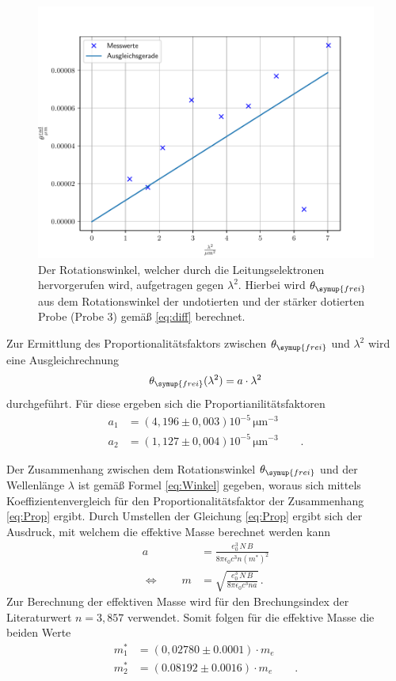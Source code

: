 \begin{figure}[h]
    \centering
    \includegraphics[width=1\textwidth]{Winkel_frei2.pdf}
    \caption{Der Rotationswinkel, welcher durch die Leitungselektronen hervorgerufen wird, aufgetragen gegen $\lambda^2$. Hierbei wird $\theta_{\symup{frei}}$ aus dem Rotationswinkel der undotierten und der stärker dotierten Probe (Probe 3) gemäß \ref{eq:diff} berechnet.}
    \label{fig:afig6}
\end{figure}
\FloatBarrier
\noindent

Zur Ermittlung des Proportionalitätsfaktors zwischen $\theta_{\symup{frei}}$ und
$\lambda^2$ wird eine Ausgleichrechnung
\begin{equation*}
    \theta_{\symup{frei}}(\lambda^2) = a\cdot \lambda ^2
\end{equation*}
durchgeführt.
Für diese ergeben sich die Proportianilitätsfaktoren
\begin{align*}
    a_1 &= (4,196 \pm 0,003)10^{-5}\, \si{\micro\meter}^{-3}\\
    a_2 &= (1,127 \pm 0,004)10^{-5}\, \si{\micro\meter}^{-3} \qquad .
\end{align*}

Der Zusammenhang zwischen dem Rotationswinkel $\theta_{\symup{frei}}$ und der Wellenlänge $\lambda$ ist gemäß Formel \ref{eq:Winkel}
gegeben, woraus sich mittels Koeffizientenvergleich für den Proportionalitätsfaktor der Zusammenhang \ref{eq:Prop} ergibt. Durch Umstellen der Gleichung \ref{eq:Prop} ergibt
sich der Ausdruck, mit welchem die effektive Masse berechnet werden kann
\begin{align}
   a &= \frac{e_0^3 \, N \, B}{8 \pi \epsilon_0 c^3 n (m^{*})^2}\\ \label{eq:Prop}
   \Leftrightarrow\qquad m &= \sqrt{\frac{e_0^3 \, N \, B}{8 \pi \epsilon_0 c^3 n a}} \, .
\end{align}
Zur Berechnung der effektiven Masse wird für den Brechungsindex der Literaturwert $n=3,857$ \cite{quelle04} verwendet. Somit folgen für die effektive Masse die beiden Werte
\begin{align*}
    m_1^{*} &= (0,02780 \pm 0.0001)\cdot m_e \\
    m_2^{*} &= (0.08192 \pm 0.0016)\cdot m_e \qquad .
\end{align*}

